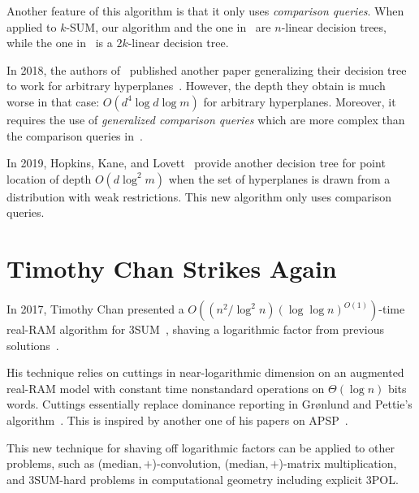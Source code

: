 Another feature of this algorithm is that it only uses \emph{comparison
queries}. When applied to \(k\)-SUM, our algorithm and the one in~\cite{ES17} are \(n\)-linear
decision trees, while the one in~\cite{KLM18} is a \(2k\)-linear decision tree.

In 2018, the authors of~\cite{KLM18} published another paper generalizing their
decision tree to work for arbitrary hyperplanes~\cite{KLM18b}. However,
the depth they obtain is much worse in that case: $O(d^4 \log d \log m)$ for
arbitrary hyperplanes. Moreover, it requires the use of \emph{generalized
comparison queries} which are more complex than the comparison queries
in~\cite{KLM18}.

In 2019,  Hopkins, Kane, and Lovett~\cite{HKL19} provide another decision
tree for point location of depth \(O(d \log^2 m)\) when the set of
hyperplanes is drawn from a distribution with weak restrictions. This new
algorithm only uses comparison queries.

\section{Timothy Chan Strikes Again}%
\label{sec:developments:3pol-algorithm}

In 2017, Timothy Chan presented a
\(O((n^2 / \log^2 n)(\log \log n)^{O(1)})\)-time real-RAM algorithm for
3SUM~\cite{Ch18}, shaving a logarithmic factor from previous solutions~\cite{Fr15,GS15}.

His technique relies on cuttings in near-logarithmic dimension on an augmented
real-RAM model with constant time nonstandard operations on $\Theta(\log n)$
bits words. Cuttings essentially replace dominance reporting in Gr\o nlund and
Pettie's algorithm~\cite{GP18}.
This is inspired by another one of his papers on APSP~\cite{Cha10}.

This new technique for shaving off logarithmic factors
can be applied to other problems, such as (\(\text{median}, +\))-convolution,
(\(\text{median}, +\))-matrix multiplication, and 3SUM-hard problems in
computational geometry including explicit 3POL.
